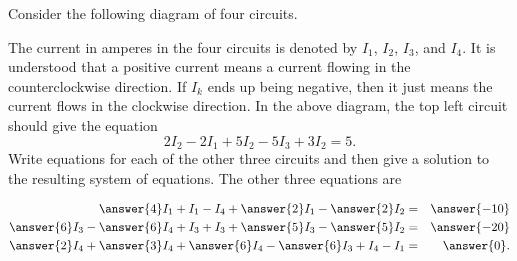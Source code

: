 \documentclass{ximera}
\author{Zack Reed}
\begin{document}
\begin{exercise}

    Consider the following diagram of four circuits.
    \begin{center}
    \end{center}
    The current in amperes in the four circuits is denoted by $I_1$,
    $I_2$, $I_3$, and $I_4$. It is understood that a positive
    current means a current flowing in the counterclockwise direction. If
    $I_k$ ends up being negative, then it just means the current flows
    in the clockwise direction.  In the above diagram, the top left
    circuit should give the equation
    \begin{equation*}
      2I_2 - 2I_1+5I_2 - 5I_3+3I_2=5.
    \end{equation*}
    Write equations for each of the other three circuits and then give a solution
    to the resulting system of equations.
      The other three equations are
  
      \begin{eqnarray*}
        \answer{4}I_1 + I_1 - I_4 + \answer{2}I_1 - \answer{2}I_2 &=& \answer{-10} \\
        \answer{6}I_3 - \answer{6}I_4 + I_3 + I_3 + \answer{5}I_3 - \answer{5}I_2 &=& \answer{-20} \\
        \answer{2}I_4 + \answer{3}I_4 + \answer{6}I_4 - \answer{6}I_3 + I_4 - I_1 &=& \answer{0}.
      \end{eqnarray*}


\end{exercise}
\end{document}
